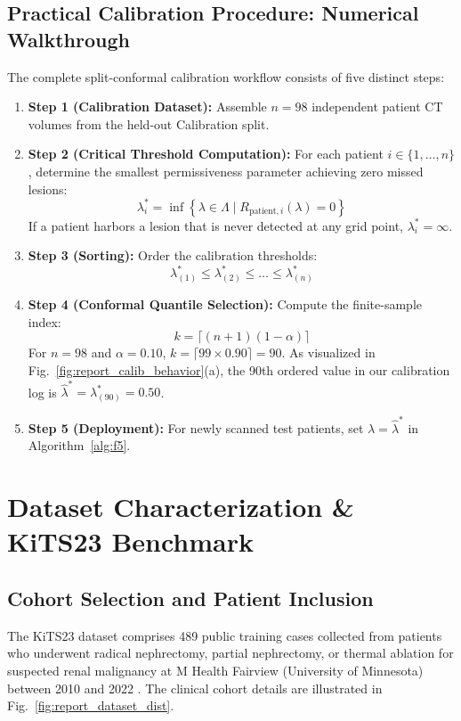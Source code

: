 \documentclass[11pt,a4paper]{report}
\begin{document}
\section{Practical Calibration Procedure: Numerical Walkthrough}
The complete split-conformal calibration workflow consists of five distinct steps:
\begin{enumerate}
    \item \textbf{Step 1 (Calibration Dataset):} Assemble $n=98$ independent patient CT volumes from the held-out Calibration split.
    \item \textbf{Step 2 (Critical Threshold Computation):} For each patient $i \in \{1, \dots, n\}$, determine the smallest permissiveness parameter achieving zero missed lesions:
    \begin{equation}
    \lambda_i^* = \inf \left\{\lambda \in \Lambda \mid R_{\mathrm{patient}, i}(\lambda) = 0\right\}
    \end{equation}
    If a patient harbors a lesion that is never detected at any grid point, $\lambda_i^* = \infty$.
    \item \textbf{Step 3 (Sorting):} Order the calibration thresholds:
    \begin{equation}
    \lambda_{(1)}^* \le \lambda_{(2)}^* \le \dots \le \lambda_{(n)}^*
    \end{equation}
    \item \textbf{Step 4 (Conformal Quantile Selection):} Compute the finite-sample index:
    \begin{equation}
    k = \lceil (n + 1)(1 - \alpha) \rceil
    \end{equation}
    For $n=98$ and $\alpha = 0.10$, $k = \lceil 99 \times 0.90 \rceil = 90$. As visualized in Fig.~\ref{fig:report_calib_behavior}(a), the 90th ordered value in our calibration log is $\hat{\lambda}^* = \lambda_{(90)}^* = 0.50$.
    \item \textbf{Step 5 (Deployment):} For newly scanned test patients, set $\lambda = \hat{\lambda}^*$ in Algorithm~\ref{alg:f5}.
\end{enumerate}

\chapter{Dataset Characterization \& KiTS23 Benchmark}

\section{Cohort Selection and Patient Inclusion}
The KiTS23 dataset comprises 489 public training cases collected from patients who underwent radical nephrectomy, partial nephrectomy, or thermal ablation for suspected renal malignancy at M Health Fairview (University of Minnesota) between 2010 and 2022 \cite{kits23challenge}. The clinical cohort details are illustrated in Fig.~\ref{fig:report_dataset_dist}.
\end{document}
